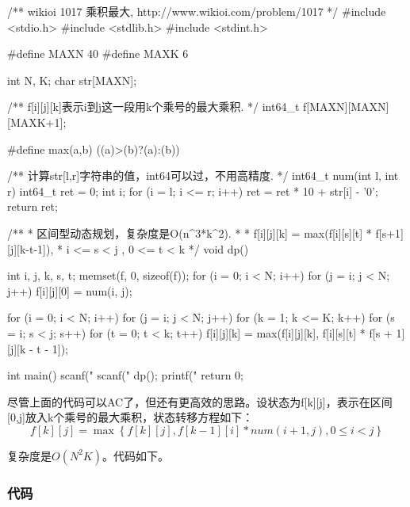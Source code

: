 \begin{Code}
/** wikioi 1017 乘积最大, http://www.wikioi.com/problem/1017 */
#include <stdio.h>
#include <stdlib.h>
#include <stdint.h>

#define MAXN 40
#define MAXK 6

int N, K;
char str[MAXN];

/** f[i][j][k]表示i到j这一段用k个乘号的最大乘积. */
int64_t f[MAXN][MAXN][MAXK+1];


#define max(a,b) ((a)>(b)?(a):(b))

/** 计算str[l,r]字符串的值，int64可以过，不用高精度. */
int64_t num(int l, int r) {
    int64_t ret = 0;
    int i;
    for (i = l; i <= r; i++) {
        ret = ret * 10 + str[i] - '0';
    }
    return ret;
}

/**
 * 区间型动态规划，复杂度是O(n^3*k^2).
 *
 * f[i][j][k] = max(f[i][s][t] * f[s+1][j][k-t-1]),
 * i <= s < j , 0 <= t < k
 */
void dp() {
    int i, j, k, s, t;
    memset(f, 0, sizeof(f));
    for (i = 0; i < N; i++) {
        for (j = i; j < N; j++) {
            f[i][j][0] = num(i, j);
        }
    }

    for (i = 0; i < N; i++) {
        for (j = i; j < N; j++) {
            for (k = 1; k <= K; k++) {
                for (s = i; s < j; s++) {
                    for (t = 0; t < k; t++) {
                        f[i][j][k] = max(f[i][j][k],
                                f[i][s][t] * f[s + 1][j][k - t - 1]);
                    }
                }
            }
        }
    }
}

int main() {
    scanf("%
    scanf("%
    dp();
    printf("%
    return 0;
}
\end{Code}

尽管上面的代码可以AC了，但还有更高效的思路。设状态为f[k][j]，表示在区间[0,j]放入k个乘号的最大乘积，状态转移方程如下：
$$
f[k][j]=\max\left\{f[k][j], f[k-1][i]*num(i+1,j), 0 \leq i < j\right\}
$$

复杂度是$O(N^2K)$。代码如下。

\subsubsection{代码}

